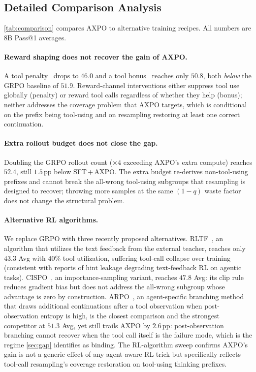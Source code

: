 \documentclass{llmxive}
\providecommand{\toolresample}{tool-call resampling\xspace}
\begin{document}
\subsection{Detailed Comparison Analysis}
\label{app:comparison-details}

\autoref{tab:comparison} compares AXPO to alternative training recipes. All numbers are 8B Pass@1 averages.

\paragraph{Reward shaping does not recover the gain of AXPO.}
A tool penalty~\citep{otc} drops to $46.0$ and a tool bonus~\citep{pyvision-rl, pixelreasoner, deepeyes} reaches only $50.8$, both \emph{below} the GRPO baseline of $51.9$. Reward-channel interventions either suppress tool use globally (penalty) or reward tool calls regardless of whether they help (bonus); neither addresses the coverage problem that AXPO targets, which is conditional on the prefix being tool-using and on resampling restoring at least one correct continuation.

\paragraph{Extra rollout budget does not close the gap.}
Doubling the GRPO rollout count ($\times 4$ exceeding AXPO's extra compute) reaches $52.4$, still $1.5$\,pp below SFT\,+\,AXPO. The extra budget re-derives non-tool-using prefixes and cannot break the all-wrong tool-using subgroups that resampling is designed to recover; throwing more samples at the same $(1{-}q)$ waste factor does not change the structural problem.

\paragraph{Alternative RL algorithms.}
We replace GRPO with three recently proposed alternatives. RLTF~\citep{rltf}, an algorithm that utilizes the text feedback from the external teacher, reaches only $43.3$ Avg with $40\%$ tool utilization, suffering tool-call collapse over training (consistent with reports of hint leakage degrading text-feedback RL on agentic tasks). CISPO~\citep{cispo}, an importance-sampling variant, reaches $47.8$ Avg: its clip rule reduces gradient bias but does not address the all-wrong subgroup whose advantage is zero by construction. ARPO~\citep{arpo}, an agent-specific branching method that draws additional continuations after a tool observation when post-observation entropy is high, is the closest comparison and the strongest competitor at $51.3$ Avg, yet still trails AXPO by $2.6$\,pp: post-observation branching cannot recover when the tool call itself is the failure mode, which is the regime \autoref{sec:gap} identifies as binding. The RL-algorithm sweep confirms AXPO's gain is not a generic effect of any agent-aware RL trick but specifically reflects \toolresample's coverage restoration on tool-using thinking prefixes.
\end{document}
